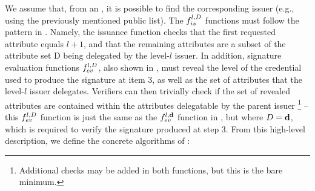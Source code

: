 We assume that, from an \ipk, it is possible to find the corresponding issuer
(e.g., using the previously mentioned public list). The
$f_{is}^{l,D}$ functions must follow the pattern in .
Namely, the issuance function checks that the first requested attribute equals
$l+1$, and that the remaining attributes are a subset of the attribute set
D being delegated by the level-$l$ issuer. In addition, signature
evaluation functions $f_{ev}^{l,D}$, also shown in ,
must reveal the level of the credential used to produce the \UAS signature at
item 3, as well as the set of attributes \dattrs that the level-$l$ issuer
delegates. Verifiers can then trivially check if the set of revealed attributes
are contained within the attributes delegatable by the parent issuer%
\footnote{Additional checks may be added in both functions, but this is
  the bare minimum.} -- this $f_{ev}^{l,D}$ function is just the same as the
$f_{ev}^{l,\mathbf{d}}$ function in , but where $D=\mathbf{d}$,
which is required to verify the \UAS signature produced at step 3.
%
From this high-level description, we define the concrete algorithms of \CUASDAC:

